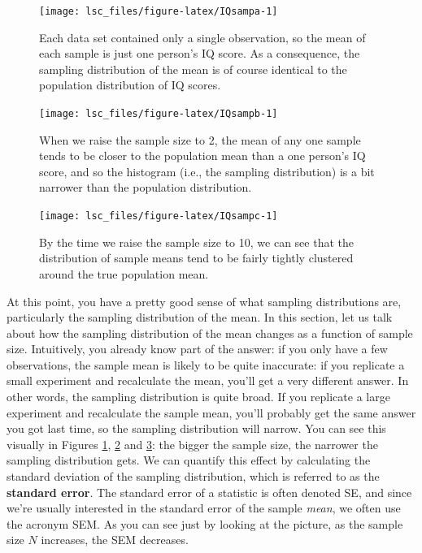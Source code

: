 \documentclass[
  11pt,
  a4paper,
  twoside,symmetric,openright]{book}
\theoremstyle{break}
\theoremstyle{break}
\begin{document}
\begin{figure}

{\centering \texttt{[image: lsc\_files/figure-latex/IQsampa-1]} 

}

\caption{Each data set contained only a single observation, so the mean of each sample is just one person's IQ score. As a consequence, the sampling distribution of the mean is of course identical to the population distribution of IQ scores.}\label{fig:IQsampa}
\end{figure}

\begin{figure}

{\centering \texttt{[image: lsc\_files/figure-latex/IQsampb-1]} 

}

\caption{When we raise the sample size to 2, the mean of any one sample tends to be closer to the population mean than a one person's IQ score, and so the histogram (i.e., the sampling distribution) is a bit narrower than the population distribution.}\label{fig:IQsampb}
\end{figure}

\begin{figure}

{\centering \texttt{[image: lsc\_files/figure-latex/IQsampc-1]} 

}

\caption{By the time we raise the sample size to 10, we can see that the distribution of sample means tend to be fairly tightly clustered around the true population mean.}\label{fig:IQsampc}
\end{figure}

At this point, you have a pretty good sense of what sampling distributions are, particularly the sampling distribution of the mean. In this section, let us talk about how the sampling distribution of the mean changes as a function of sample size. Intuitively, you already know part of the answer: if you only have a few observations, the sample mean is likely to be quite inaccurate: if you replicate a small experiment and recalculate the mean, you'll get a very different answer. In other words, the sampling distribution is quite broad. If you replicate a large experiment and recalculate the sample mean, you'll probably get the same answer you got last time, so the sampling distribution will narrow. You can see this visually in Figures \ref{fig:IQsampa}, \ref{fig:IQsampb} and \ref{fig:IQsampc}: the bigger the sample size, the narrower the sampling distribution gets. We can quantify this effect by calculating the standard deviation of the sampling distribution, which is referred to as the \textbf{standard error}. The standard error of a statistic is often denoted SE, and since we're usually interested in the standard error of the sample \emph{mean}, we often use the acronym SEM. As you can see just by looking at the picture, as the sample size \(N\) increases, the SEM decreases.
\end{document}
